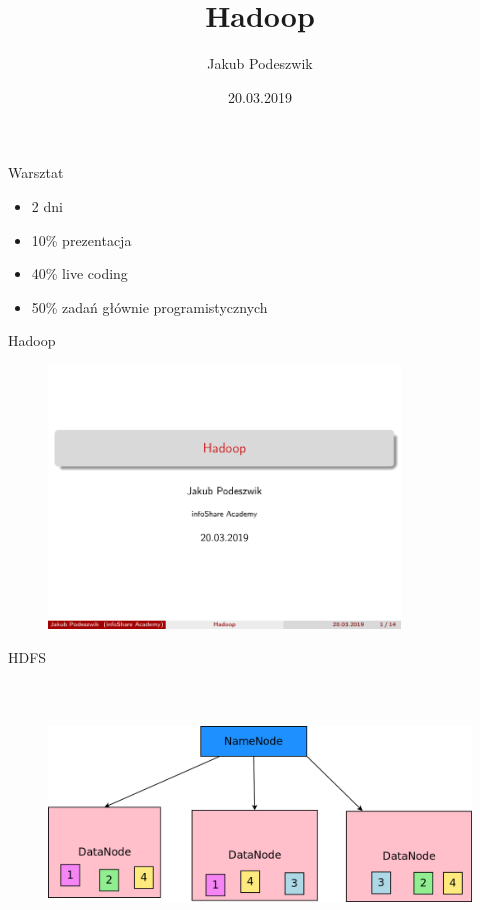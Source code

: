 \documentclass{beamer}
\title[Hadoop]{Hadoop}
\author{Jakub Podeszwik}
\institute{infoShare Academy}
\date{20.03.2019}
\begin{document}
\begin{frame}
  \titlepage
\end{frame}

\begin{frame}{Warsztat}
	\begin{itemize}
		\item 2 dni
		\item 10\% prezentacja
		\item 40\% live coding
		\item 50\% zadań głównie programistycznych
	\end{itemize}
\end{frame}

\begin{frame}{Hadoop}
	\begin{figure}
		\includegraphics[width=\textwidth,height=7cm,keepaspectratio=true]{hadoop}
	\end{figure}
\end{frame}
\begin{frame}{HDFS}
	\begin{figure}
		\includegraphics[width=\textwidth,height=7cm,keepaspectratio=true]{hdfs}
	\end{figure}
\end{frame}
\end{document}
